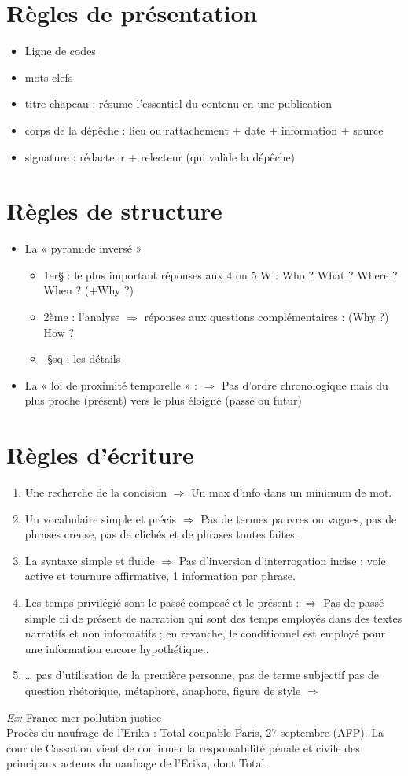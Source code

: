 \documentclass[a4paper,11pt]{report}
\begin{document}
\section{Règles de présentation}
\begin{itemize}
    \item Ligne de codes
    \item mots clefs
    \item  titre chapeau : résume l’essentiel du contenu en une publication
    \item corps de la dépêche : lieu ou rattachement + date + information + source
    \item signature : rédacteur + relecteur (qui valide la dépêche)
\end{itemize}
 
\section{Règles de structure}
\begin{itemize}
    \item La « pyramide inversé » 
    \begin{itemize}
        \item 1er§ : le plus important  réponses aux 4 ou 5 W : Who ? What ? Where ? When ? (+Why ?)
        \item 2ème : l’analyse $\Rightarrow$ réponses aux questions complémentaires : (Why ?) How ?
        \item -§sq : les détails
    \end{itemize}
   \item La « loi de proximité temporelle » : $\Rightarrow$ Pas d’ordre chronologique mais du plus proche (présent) vers le plus éloigné (passé ou futur)
\end{itemize}

\section{Règles d’écriture}
\begin{enumerate}
    \item  Une recherche de la concision $\Rightarrow$ Un max d’info dans un minimum de mot.
    \item  Un vocabulaire simple et précis $\Rightarrow$ Pas de termes pauvres ou vagues, pas de phrases creuse, pas de clichés et de phrases toutes faites.
    \item La syntaxe simple et fluide $\Rightarrow$ Pas d’inversion d’interrogation incise ; voie active et tournure affirmative, 1 information par phrase.
    \item Les temps privilégié sont le passé composé et le présent : $\Rightarrow$ Pas de passé simple ni de présent de narration qui sont des temps employés dans des textes narratifs et non informatifs ; en revanche, le conditionnel est employé pour une information encore hypothétique..
    \item  … pas d’utilisation de la première personne, pas de terme subjectif pas de question rhétorique, métaphore, anaphore, figure de style $\Rightarrow$
\end{enumerate}

\textit{Ex:} France-mer-pollution-justice \\
Procès du naufrage de l’Erika : Total coupable Paris, 27 septembre (AFP). La cour de Cassation vient de confirmer la responsabilité pénale et civile des principaux acteurs du naufrage de l’Erika, dont Total.
\end{document}
